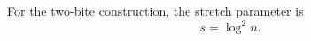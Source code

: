 \begin{definition}
For the two-bite construction, the stretch parameter is
\[
s=\log^2 n.
\]
\end{definition}
